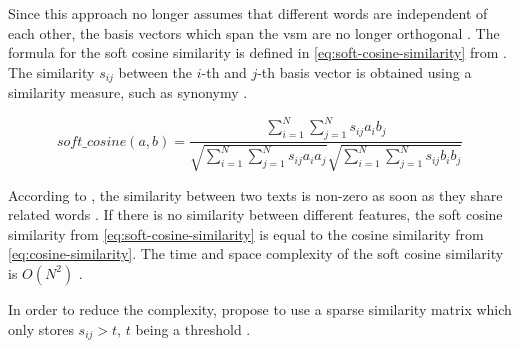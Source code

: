 Since this approach no longer assumes that different words are independent of each other, 
the basis vectors which span the \ac{vsm} are no longer orthogonal \cite{soft_cosine2014}.
The formula for the soft cosine similarity is defined in \autoref{eq:soft-cosine-similarity} from \cite{soft_cosine2014}.
The similarity $s_{ij}$ between the $i$-th and $j$-th basis vector is obtained using a similarity measure, such as synonymy \cite{soft_cosine2014}.

\begin{equation}
    soft\_cosine(a,b) = \frac{\sum_{i=1}^{N}\sum_{j=1}^{N}s_{ij}a_{i}b_{j}}{\sqrt{\sum_{i=1}^{N}\sum_{j=1}^{N}s_{ij}a_{i}a_{j}}\sqrt{\sum_{i=1}^{N}\sum_{j=1}^{N}s_{ij}b_{i}b_{j}}}
    \label{eq:soft-cosine-similarity}
\end{equation}

According to \citeauthor{soft_cosine2017}, the similarity between two texts is non-zero as soon as they share related words \cite{soft_cosine2017}.
If there is no similarity between different features, 
the soft cosine similarity from \autoref{eq:soft-cosine-similarity} is equal to the cosine similarity from \autoref{eq:cosine-similarity}.
The time and space complexity of the soft cosine similarity is $O(N^2)$ \cite{soft_cosine2014}.

In order to reduce the complexity, \citeauthor{soft_cosine2014} propose to use a sparse similarity matrix which only stores $s_{ij} > t$, 
$t$ being a threshold \cite{soft_cosine2014}.